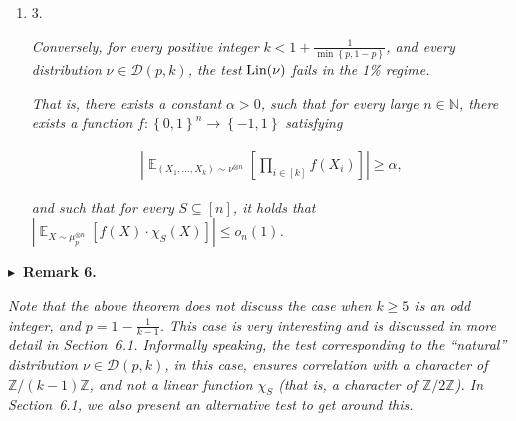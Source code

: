\begin{enumerate}
\item[] 
3. 


\emph{Conversely, for every positive integer }$k<1+\frac{1}{\min\left\{p,1-p\right\}}$\emph{, and every distribution }$\nu\in\mathcal{D}(p,k)$\emph{, the test }$\textnormal{Lin}(\nu)$\emph{ fails in the 1\% regime.}\par




\emph{That is, there exists a constant }$\alpha>0$\emph{, such that for every large }$n\in\mathbb{N}$\emph{, there exists a function }$f:\left\{0,1\right\}^{n}\to\left\{-1,1\right\}$\emph{ satisfying}\par


\[\begin{gathered}
\left|\mathop{\mathbb{E}}_{(X_{1},\dots,X_{k})\sim\nu^{\otimes n}}\left[\prod_{i\in[k]}f(X_{i})\right]\right|\geqslant\alpha,
\end{gathered}\]


\emph{and such that for every }$S\subseteq[n]$\emph{, it holds that }$\left|\mathop{\mathbb{E}}_{X\sim\mu_{p}^{\otimes n}}\left[f(X)\cdot\chi_{S}(X)\right]\right|\leqslant o_{n}(1)$\emph{.}\par





\end{enumerate}







\par\medskip\noindent\textbf{
$\blacktriangleright$ Remark 6.
}\par



\emph{Note that the above theorem does not discuss the case when $k\geqslant 5$ is an odd integer, and $p=1-\frac{1}{k-1}$.
This case is very interesting and is discussed in more detail in Section 6.1.
Informally speaking, the test corresponding to the “natural” distribution $\nu\in\mathcal{D}(p,k)$, in this case, ensures correlation with a character of $\mathbb{Z}/(k-1)\mathbb{Z}$, and not a linear function $\chi_{S}$ (that is, a character of $\mathbb{Z}/2\mathbb{Z}$).
In Section 6.1, we also present an alternative test to get around this.}\par






